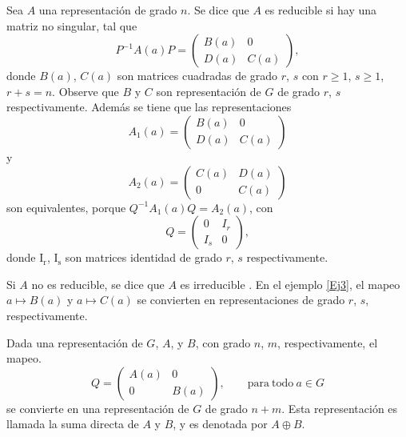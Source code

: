 \documentclass[12pt]{book}
\theoremstyle{definition}
\newcounter{in}
\begin{document}
Sea $A$ una representación de grado $n$. Se dice que $A$ es reducible
si hay una matriz no singular, tal que
\begin{equation*}
  P^{-1}A\left(a\right)P=
  \begin{pmatrix}
    B\left(a\right) & 0 \\
    D\left(a\right) & C\left(a\right)
  \end{pmatrix}, 
\end{equation*}  
donde $B\left(a\right)$, $C\left(a\right)$ son matrices cuadradas de
grado $r$, $s$ con $r \geq 1$, $s \geq 1$, $r+s=n$. Observe que $B$ y
$C$ son representación de $G$ de grado $r$, $s$
respectivamente. Además se tiene que las representaciones
\begin{equation*}
  A_{1}\left(a\right)=
  \begin{pmatrix}
    B\left(a\right) & 0 \\
    D\left(a\right) & C\left(a\right)
  \end{pmatrix}
\end{equation*}
y
\begin{equation*} 
   A_{2}\left(a\right)=
  \begin{pmatrix}
    C\left(a\right) & D\left(a\right) \\
    0 & C\left(a\right)
  \end{pmatrix}
\end{equation*}
son equivalentes, porque
$Q^{-1}A_{1}\left(a\right)Q=A_{2}\left(a\right)$, con
\begin{equation*}
  Q=
  \begin{pmatrix}
    0 & I_{r} \\ 
    I_{s} & 0
  \end{pmatrix},
\end{equation*}
donde $ \mathrm{I_{r}}$, $ \mathrm{I_{s}}$ son matrices identidad de
grado $r$, $s$ respectivamente.

Si $A$ no es reducible, se dice que $A$ es irreducible . En el ejemplo
\ref{Ej3}, el mapeo $a \mapsto B\left(a\right)$ y
$a \mapsto C\left(a\right)$ se convierten en representaciones de grado
$r$, $s$, respectivamente.

Dada una representación de $G$, $A$, y $B$, con grado $n$, $m$,
respectivamente, el mapeo.
\begin{equation*}
  Q=
  \begin{pmatrix}
    A\left(a\right) & 0 \\ 
    0 & B\left(a\right)
  \end{pmatrix}, \qquad \mathrm{para\ todo\ } a \in G
\end{equation*}
se convierte en una representación de $G$ de grado $n+m$. Esta
representación es llamada la suma directa de $A$ y
$B$, y es denotada por $A \oplus B$.
\end{document}

